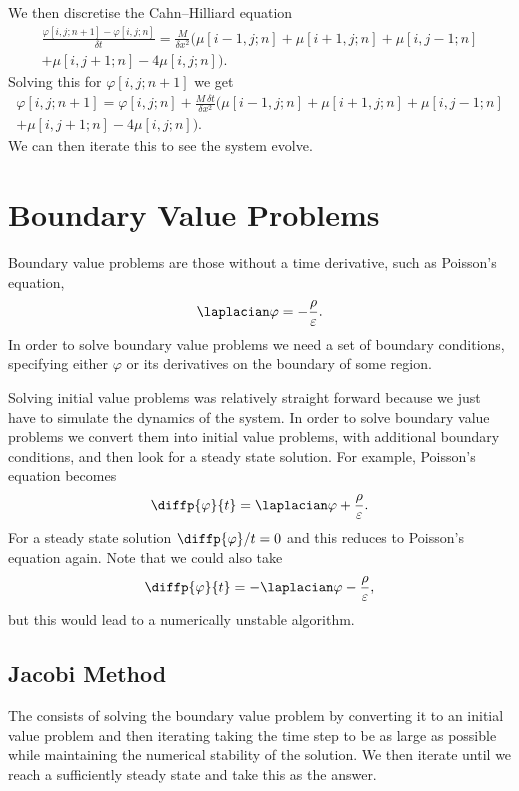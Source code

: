 \documentclass[fleqn]{NotesClass}
\begin{document}
    We then discretise the Cahn--Hilliard equation
    \begin{multline}
        \frac{\varphi[i, j; n + 1] - \varphi[i, j; n]}{\delta t} = \frac{M}{\delta x^2}(\mu[i - 1, j; n] + \mu[i + 1, j; n] + \mu[i, j - 1; n]\\
        + \mu[i, j + 1; n] - 4\mu[i, j; n]).
    \end{multline}
    Solving this for \(\varphi[i, j; n + 1]\) we get
    \begin{multline}
        \varphi[i, j; n + 1] = \varphi[i, j; n] + \frac{M \, \delta t}{\delta x^2}(\mu[i - 1, j; n] + \mu[i + 1, j; n] + \mu[i, j - 1; n]\\
        + \mu[i, j + 1; n] - 4\mu[i, j; n]).
    \end{multline}
    We can then iterate this to see the system evolve.
    
    \chapter{Boundary Value Problems}
    Boundary value problems are those without a time derivative, such as Poisson's equation,
    \begin{equation}
        \laplacian \varphi = -\frac{\rho}{\varepsilon}.
    \end{equation}
    In order to solve boundary value problems we need a set of boundary conditions, specifying either \(\varphi\) or its derivatives on the boundary of some region.
    
    Solving initial value problems was relatively straight forward because we just have to simulate the dynamics of the system.
    In order to solve boundary value problems we convert them into initial value problems, with additional boundary conditions, and then look for a steady state solution.
    For example, Poisson's equation becomes
    \begin{equation}
        \diffp{\varphi}{t} = \laplacian\varphi + \frac{\rho}{\varepsilon}.
    \end{equation}
    For a steady state solution \(\diffp{\varphi}/{t} = 0\) and this reduces to Poisson's equation again.
    Note that we could also take
    \begin{equation}
        \diffp{\varphi}{t} = -\laplacian\varphi - \frac{\rho}{\varepsilon},
    \end{equation}
    but this would lead to a numerically unstable algorithm.
    
    \section{Jacobi Method}
    The  consists of solving the boundary value problem by converting it to an initial value problem and then iterating taking the time step to be as large as possible while maintaining the numerical stability of the solution.
    We then iterate until we reach a sufficiently steady state and take this as the answer.
    
\end{document}
